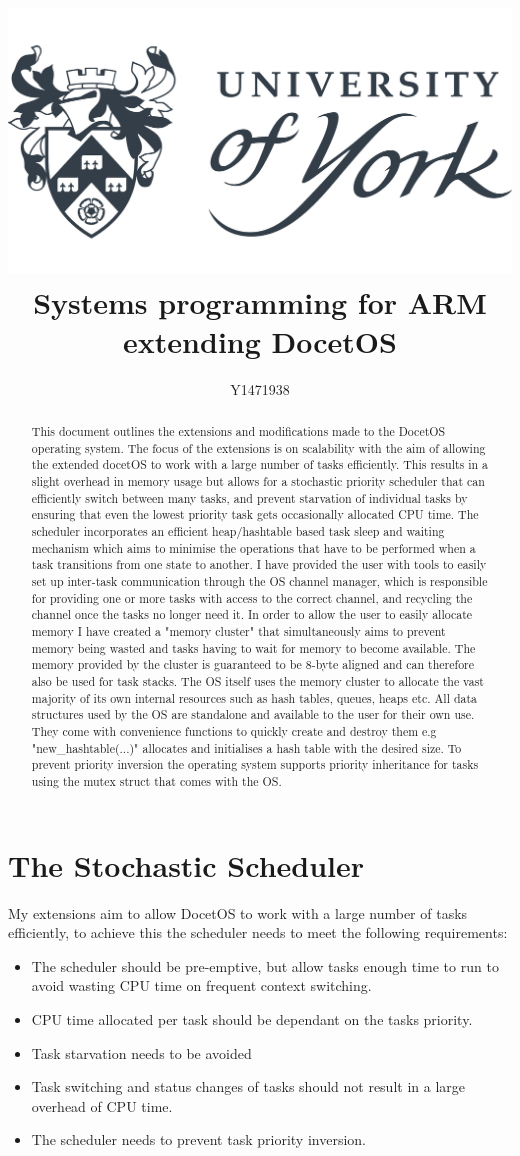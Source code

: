\documentclass[12pt,a4paper]{article}
\author{Y1471938}
\title{
\includegraphics[width=\textwidth]{images/yorkUniLogo.png}\\
\textbf{Systems programming for ARM}\\ extending DocetOS}
\begin{document}
\maketitle
\begin{abstract}
This document outlines the extensions and modifications made to the DocetOS operating system. The focus of the extensions is on scalability with the aim of allowing the extended docetOS to work with a large number of tasks efficiently. This results in a slight overhead in memory usage but allows for a stochastic priority scheduler that can efficiently switch between many tasks, and prevent starvation of individual tasks by ensuring that even the lowest priority task gets occasionally allocated CPU time. The scheduler incorporates an efficient heap/hashtable based task sleep and waiting mechanism which aims to minimise the operations that have to be performed when a task transitions from one state to another. I have provided the user with tools to easily set up inter-task communication through the OS channel manager, which is responsible for providing one or more tasks with access to the correct channel, and recycling the channel once the tasks no longer need it. In order to allow the user to easily allocate memory I have created a "memory cluster" that simultaneously aims to prevent memory being wasted and tasks having to wait for memory to become available. The memory provided by the cluster is guaranteed to be 8-byte aligned and can therefore also be used for task stacks. The OS itself uses the memory cluster to allocate the vast majority of its own internal resources such as hash tables, queues, heaps etc. All data structures used by the OS are standalone and available to the user for their own use. They come with convenience functions to quickly create and destroy them e.g "new\_hashtable(...)" allocates and initialises a hash table with the desired size. To prevent priority inversion the operating system supports priority inheritance for tasks using the mutex struct that comes with the OS.
\end{abstract}
\pagebreak
\tableofcontents
\pagebreak
\section{The Stochastic Scheduler}
My extensions aim to allow DocetOS to work with a large number of tasks efficiently, to achieve this the scheduler needs to meet the following requirements:
\begin{itemize}
\setlength\itemsep{0.0em}
  \item The scheduler should be pre-emptive, but allow tasks enough time to run to avoid wasting CPU time on frequent context switching.
  \item CPU time allocated per task should be dependant on the tasks priority.
  \item Task starvation needs to be avoided
  \item Task switching and status changes of tasks should not result in a large overhead of CPU time.
  \item The scheduler needs to prevent task priority inversion.
\end{itemize}
\end{document}
